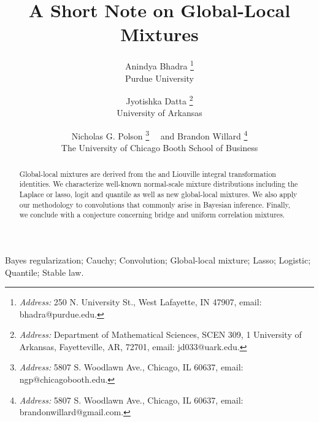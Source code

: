 \documentclass[11pt]{article}
\begin{document}

\title{\vspace{-1cm} A Short Note on Global-Local Mixtures}

\author{Anindya Bhadra  \footnote{{\em Address:} 250 N. University St., West Lafayette, IN 47907, email: bhadra@purdue.edu.} \\Purdue University
\and Jyotishka Datta  \footnote{{\em Address:} Department of Mathematical Sciences, SCEN 309, 1 University of Arkansas, Fayetteville, AR, 72701, email: jd033@uark.edu.}\\ University of Arkansas\\
\and Nicholas G. Polson \footnote{{\em Address:} 5807 S. Woodlawn Ave., Chicago, IL 60637, email: ngp@chicagobooth.edu.}  \ \ and Brandon Willard \footnote{{\em Address:} 5807 S. Woodlawn Ave., Chicago, IL 60637, email: brandonwillard@gmail.com.} \\The University of Chicago Booth School of
Business}

\maketitle

\begin{abstract}
Global-local mixtures are derived from the \CS{} and Liouville integral transformation identities. We characterize well-known normal-scale mixture distributions including the Laplace or lasso, logit and quantile as well as new global-local mixtures. We also apply our methodology to convolutions that commonly arise in Bayesian inference. Finally, we conclude with a conjecture concerning bridge and uniform correlation mixtures. 
\end{abstract}

Bayes regularization; Cauchy; Convolution; Global-local mixture; Lasso;  Logistic; Quantile; Stable law. %
\end{document}
